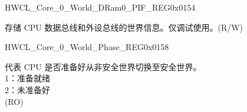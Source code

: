 \begin{register}{H}{WCL\_Core\_0\_World\_DRam0\_PIF\_REG}{0x0154}\label{regdesc:WCLCORE0WORLDDRAM0PIFREG}
%
%
\regnewline%
\begin{regdesc}\begin{reglist}
\label{fielddesc:WCLCORE0WORLDDRAM0PIF}\item [WCL\_CORE\_0\_WORLD\_DRAM0\_PIF] 存储 CPU 数据总线和外设总线的世界信息。仅调试使用。(R/W)
\end{reglist}\end{regdesc}
\end{register}


\begin{register}{H}{WCL\_Core\_0\_World\_Phase\_REG}{0x0158}\label{regdesc:WCLCORE0WORLDPHASEREG}
%
%
\regnewline%
\begin{regdesc}\begin{reglist}
\label{fielddesc:WCLCORE0WORLDPHASE}\item [WCL\_CORE\_0\_WORLD\_PHASE] 代表 CPU 是否准备好从非安全世界切换至安全世界。\\
1：准备就绪\\
2：未准备好\\ 
(RO)
\end{reglist}\end{regdesc}
\end{register}
